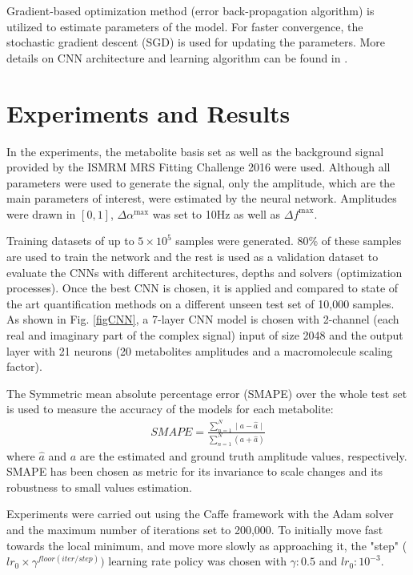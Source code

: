 \documentclass{llncs}
\begin{document}
Gradient-based optimization method (error back-propagation algorithm) is utilized to estimate parameters of the model. For faster convergence, the stochastic gradient descent (SGD) is used for updating the parameters. 
More details on CNN architecture and learning algorithm can be found in 
 \cite{lecun1998efficient,Bouvrie06}.

\section{Experiments and Results}

In the experiments, the metabolite basis set as well as the background signal provided by the ISMRM MRS Fitting Challenge 2016 %
were used. Although all parameters were used to generate the signal, only the amplitude, which are the main parameters of interest,
were estimated by the neural network.
Amplitudes were drawn in $[0,1]$, $\Delta \alpha^\text{max}$ was set to 10Hz as well as $\Delta f^\text{max}$.

Training datasets of up to $5\times10^5$ samples were generated. 80\% of these samples are used to train the network and the rest is used 
as a validation dataset to evaluate the CNNs with different architectures, depths and solvers (optimization processes).
Once the best CNN is chosen, it is applied and compared to state of the art quantification methods on a different unseen test set
of 10,000 samples. 
As shown in Fig. \ref{figCNN}, a 7-layer CNN model is chosen with 2-channel (each real and imaginary part of the complex signal) input of size 2048 and the output layer with 21 neurons (20 metabolites amplitudes and a macromolecule scaling factor). 

The Symmetric mean absolute percentage error (SMAPE) \cite{SMAPE} over the whole test set is used to measure the accuracy of the models for each metabolite:
\begin{eqnarray}
SMAPE = \frac{\sum_{n=1}^{N} \mid a - \hat{a}\mid } {\sum_{n=1}^{N} (a + \hat{a})}
\end{eqnarray}
where $\hat{a}$ and $a$ are the estimated and ground truth amplitude values, respectively. 
SMAPE has been chosen as metric for its invariance to scale changes and its robustness to small values estimation.

Experiments were carried out using the Caffe framework \cite{caffe} with the Adam solver and the maximum number of iterations set to 200,000.
To initially move fast towards the local minimum, and move more slowly as approaching it, the "step" ($lr_0 \times \gamma^{floor(iter / step)})$ learning rate policy was chosen with $\gamma:0.5$ and $lr_0:10^{-3}$. 
\end{document}
